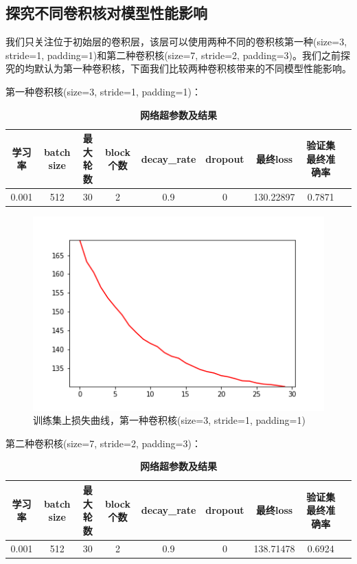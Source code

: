 \documentclass{article}
\begin{document}
\subsection{探究不同卷积核对模型性能影响}
我们只关注位于初始层的卷积层，该层可以使用两种不同的卷积核第一种(size=3, stride=1, padding=1)和第二种卷积核(size=7, stride=2, padding=3)。我们之前探究的均默认为第一种卷积核，下面我们比较两种卷积核带来的不同模型性能影响。

第一种卷积核(size=3, stride=1, padding=1)：
\begin{table}[!ht]
	\caption{\textbf{网络超参数及结果}}%
	\centering%
	\begin{tabular}{ccccccccc}
		\hline
		学习率    & batch size & 最大轮数 & block个数 & decay\_rate & dropout & 最终loss & 验证集最终准确率\\ \hline
		0.001 & 512    & 30  &  2  & 0.9 &0 & 130.22897  & 0.7871   \\ \hline
	\end{tabular}
\end{table}

\clearpage
\begin{figure}[!ht]
	\centering %
	\includegraphics[scale=0.5]{runing-loss-4.png}
	\caption{训练集上损失曲线，第一种卷积核(size=3, stride=1, padding=1)}
\end{figure}

第二种卷积核(size=7, stride=2, padding=3)：
\begin{table}[!ht]
	\caption{\textbf{网络超参数及结果}}%
	\centering%
	\begin{tabular}{ccccccccc}
		\hline
		学习率    & batch size & 最大轮数 & block个数 & decay\_rate & dropout & 最终loss & 验证集最终准确率\\ \hline
		0.001 & 512    & 30  &  2  & 0.9 &0 & 138.71478  &  0.6924  \\ \hline
	\end{tabular}
\end{table}
\end{document}
